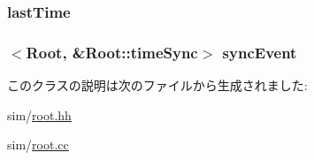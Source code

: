 \label{classRoot_a95af4ca66c183d211cbe51f28f876625}
\hypertarget{classRoot_af285d39478c6a28a617a471a6232fd4c}{
\subsubsection[{lastTime}]{ {\bf lastTime}}}
\label{classRoot_af285d39478c6a28a617a471a6232fd4c}
\hypertarget{classRoot_ac83acdff678c3ae9e22c78d639866177}{
\subsubsection[{syncEvent}]{$<${\bf Root}, \&Root::timeSync$>$ {\bf syncEvent}}}
\label{classRoot_ac83acdff678c3ae9e22c78d639866177}


このクラスの説明は次のファイルから生成されました:\begin{DoxyCompactItemize}
\item 
sim/\hyperlink{root_8hh}{root.hh}\item 
sim/\hyperlink{root_8cc}{root.cc}\end{DoxyCompactItemize}
